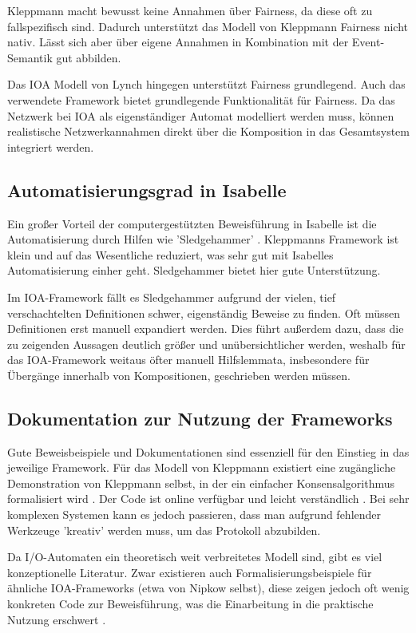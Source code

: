 \documentclass[12pt,a4paper]{tucarticle2019}
\begin{document}
	Kleppmann macht bewusst keine Annahmen über Fairness, da diese oft zu fallspezifisch sind. Dadurch unterstützt das Modell von Kleppmann Fairness nicht nativ. Lässt sich aber über eigene Annahmen in Kombination mit der Event-Semantik gut abbilden. 
	
	Das IOA Modell von Lynch hingegen unterstützt Fairness grundlegend. Auch das verwendete Framework bietet grundlegende Funktionalität für Fairness. Da das Netzwerk bei IOA als eigenständiger Automat modelliert werden muss, können realistische Netzwerkannahmen direkt über die Komposition in das Gesamtsystem integriert werden.
	
	\newpage
	\subsection{Automatisierungsgrad in Isabelle}
	Ein großer Vorteil der computergestützten Beweisführung in Isabelle ist die Automatisierung durch Hilfen wie 'Sledgehammer' \cite{semantics}. 
	Kleppmanns Framework ist klein und auf das Wesentliche reduziert, was sehr gut mit Isabelles Automatisierung einher geht. Sledgehammer bietet hier gute Unterstützung. 
	
	Im IOA-Framework fällt es Sledgehammer aufgrund der vielen, tief verschachtelten Definitionen schwer, eigenständig Beweise zu finden. Oft müssen Definitionen erst manuell expandiert werden. Dies führt außerdem dazu, dass die zu zeigenden Aussagen deutlich größer und unübersichtlicher werden, weshalb für das IOA-Framework weitaus öfter manuell Hilfslemmata, insbesondere für Übergänge innerhalb von Kompositionen, geschrieben werden müssen.
	\subsection{Dokumentation zur Nutzung der Frameworks}
	Gute Beweisbeispiele und Dokumentationen sind essenziell für den Einstieg in das jeweilige Framework.
	Für das Modell von Kleppmann existiert eine zugängliche Demonstration von Kleppmann selbst, in der ein einfacher Konsensalgorithmus formalisiert wird \cite{kleppmannblog}. Der Code ist online verfügbar und leicht verständlich \cite{kleppmanncode}. Bei sehr komplexen Systemen kann es jedoch passieren, dass man aufgrund fehlender Werkzeuge 'kreativ' werden muss, um das Protokoll abzubilden. 
	
	Da I/O-Automaten ein theoretisch weit verbreitetes Modell sind, gibt es viel konzeptionelle Literatur. Zwar existieren auch Formalisierungsbeispiele für ähnliche IOA-Frameworks (etwa von Nipkow selbst), diese zeigen jedoch oft wenig konkreten Code zur Beweisführung, was die Einarbeitung in die praktische Nutzung erschwert \cite{ioaOldFramework} \cite{ioaHolCF}.
	
\end{document}
